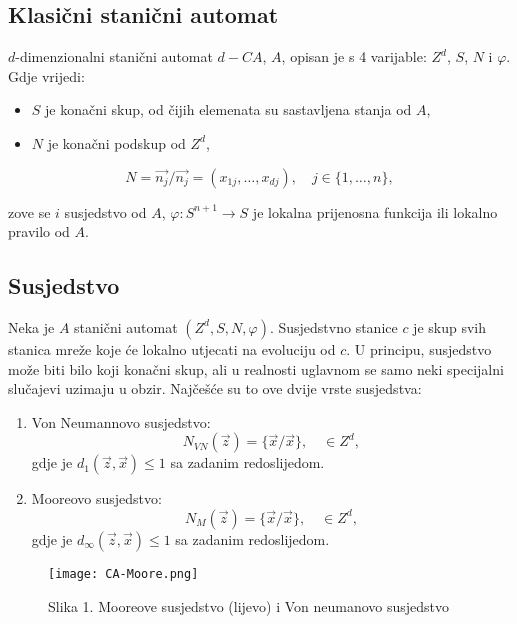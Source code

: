 \documentclass[11pt]{article}
\makeatletter
\def\maxwidth{\ifdim\Gin@nat@width>\linewidth\linewidth
    \else\Gin@nat@width\fi}
\let\Oldincludegraphics\includegraphics
\renewcommand{\includegraphics}[1]{\Oldincludegraphics[width=.8\maxwidth]{#1}}
\providecommand{\tightlist}{%
      \setlength{\itemsep}{0pt}\setlength{\parskip}{0pt}}
\makeatother
\begin{document}
\subsection{Klasični stanični
automat}\label{klasiux10dni-staniux10dni-automat}

\(d\)-dimenzionalni stanični automat \(d-CA\), \(A\), opisan je s 4
varijable: \(Z^d\), \(S\), \(N\) i \(\varphi\). Gdje vrijedi:

\begin{itemize}
\tightlist
\item
  \(S\) je konačni skup, od čijih elemenata su sastavljena stanja od
  \(A\),
\item
  \(N\) je konačni podskup od \(Z^d\),
\end{itemize}

\[ 
N = \overrightarrow{n_{j}}/\overrightarrow{n_{j}} = (x_{1j},\ldots,x_{dj}),\quad j \in \{1,\ldots,n\},
\]

zove se \(i\) susjedstvo od \(A\), \(\varphi : S^{n+1} \to S\) je
lokalna prijenosna funkcija ili lokalno pravilo od \(A\).

\subsection{Susjedstvo}\label{susjedstvo}

Neka je \(A\) stanični automat \((Z^d, S, N, \varphi)\). Susjedstvno
stanice \(c\) je skup svih stanica mreže koje će lokalno utjecati na
evoluciju od \(c\). U principu, susjedstvo može biti bilo koji konačni
skup, ali u realnosti uglavnom se samo neki specijalni slučajevi uzimaju
u obzir. Najčešće su to ove dvije vrste susjedstva:

\begin{enumerate}
\def\labelenumi{\arabic{enumi}.}
\item
  Von Neumannovo susjedstvo: \[
  N_{VN}(\overrightarrow{z}) = \{\overrightarrow{x}/\overrightarrow{x}\},\quad \in Z^d,
  \] gdje je
  \(d_{1}(\overrightarrow{z}, \overrightarrow{x})\leqslant 1\) sa
  zadanim redoslijedom.
\item
  Mooreovo susjedstvo: \[
  N_{M}(\overrightarrow{z}) = \{\overrightarrow{x}/\overrightarrow{x}\},\quad  \in Z^d,
  \] gdje je
  \(d_{\infty}(\overrightarrow{z},\overrightarrow{x}) \leqslant 1\) sa
  zadanim redoslijedom.
\end{enumerate}

\begin{figure}[hbtp]
\centering
\caption{Slika 1. Mooreove susjedstvo (lijevo) i Von neumanovo susjedstvo}
\texttt{[image: CA-Moore.png]}
\end{figure}
\end{document}

